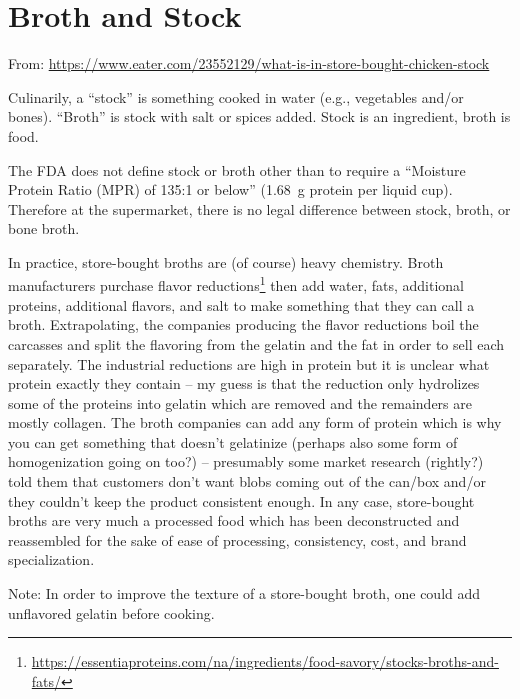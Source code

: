 
\section{Broth and Stock}
{\footnotesize From: \url{https://www.eater.com/23552129/what-is-in-store-bought-chicken-stock}}

Culinarily, a ``stock'' is something cooked in water (e.g., vegetables and/or bones).
``Broth'' is stock with salt or spices added. Stock is an ingredient, broth is food.

The FDA does not define stock or broth other than to require a ``Moisture Protein
Ratio (MPR) of 135:1 or below'' (\qty{1.68}{g} protein per liquid cup). Therefore at
the supermarket, there is no legal difference between stock, broth, or bone broth.

In practice, store-bought broths are (of course) heavy chemistry. Broth manufacturers
purchase flavor
reductions\footnote{\url{https://essentiaproteins.com/na/ingredients/food-savory/stocks-broths-and-fats/}}
then add water, fats, additional proteins, additional flavors, and salt to make
something that they can call a broth. Extrapolating, the companies producing the
flavor reductions boil the carcasses and split the flavoring from the gelatin and the
fat in order to sell each separately. The industrial reductions are high in protein
but it is unclear what protein exactly they contain -- my guess is that the reduction
only hydrolizes some of the proteins into gelatin which are removed and the
remainders are mostly collagen. The broth companies can add any form of protein which
is why you can get something that doesn't gelatinize (perhaps also some form of
homogenization going on too?) -- presumably some market research (rightly?) told them
that customers don't want blobs coming out of the can/box and/or they couldn't keep
the product consistent enough. In any case, store-bought broths are very much a
processed food which has been deconstructed and reassembled for the sake of ease of
processing, consistency, cost, and brand specialization.

Note: In order to improve the texture of a store-bought broth, one could add
unflavored gelatin before cooking.


